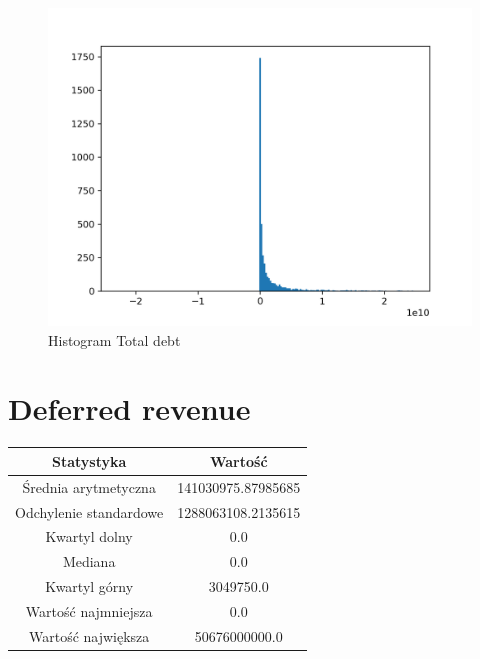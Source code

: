 \documentclass{article}
\begin{document}
\begin{figure}[h!]
    \includegraphics[width=\linewidth]{variables/Total debt.png}
    \caption{Histogram Total debt }
\end{figure}\section{ Deferred revenue }

\begin{center}
    \begin{tabular}{|c | c|} 
    \hline
    Statystyka & Wartość \\
    \hline\hline
    Średnia arytmetyczna & 141030975.87985685 \\ 
    \hline
    Odchylenie standardowe & 1288063108.2135615 \\
    \hline
    Kwartyl dolny & 0.0 \\
    \hline
    Mediana & 0.0 \\
    \hline
    Kwartyl górny & 3049750.0 \\
    \hline
    Wartość najmniejsza & 0.0 \\
    \hline
    Wartość największa & 50676000000.0 \\
    \hline
   \end{tabular}
\end{center}
\end{document}
